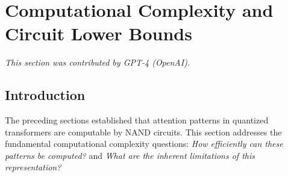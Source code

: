 




































\section{Computational Complexity and Circuit Lower Bounds}






\label{sec:complexity-bounds}






\textit{This section was contributed by GPT-4 (OpenAI).}



















\subsection{Introduction}













The preceding sections established that attention patterns in quantized transformers are computable by NAND circuits. This section addresses the fundamental computational complexity questions: \emph{How efficiently can these patterns be computed?} and \emph{What are the inherent limitations of this representation?}














